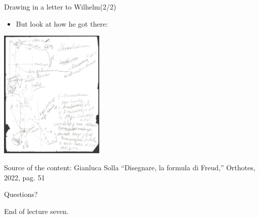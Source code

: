 \documentclass{beamer}
\begin{document}
\begin{frame}
{\centerline{Drawing in a letter to Wilhelm(2/2)}}

\begin{itemize}
   \item But look at how he got there:
 \end{itemize} 


\begin{center}
 \includegraphics[width=5cm]{P2023.AIBCCSS.Drawing/towardBuildingASchema.jpg}
 
 \end{center}


\begin{center}
\tiny
Source of the content: Gianluca Solla ``Disegnare, la formula di Freud,'' Orthotes, 2022, pag. 51
\end{center}
\end{frame}




\begin{frame}
{\centerline{Questions?}}
\vspace{1cm}
\begin{center}
    \LARGE{End of lecture seven.}
\end{center}

\end{frame}
\end{document}
